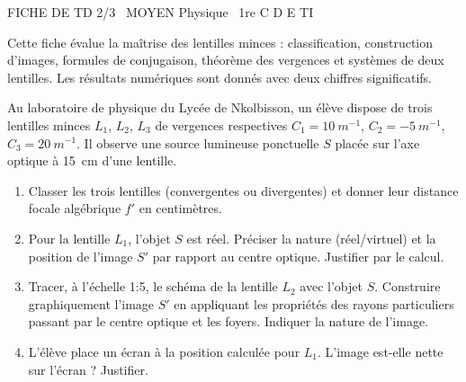 \documentclass[11pt]{article}
\begin{document}
\begin{tcolorbox}[enhanced,colback=popink,colframe=popink,arc=10pt,boxrule=0pt,left=12pt,right=12pt,top=9pt,bottom=9pt]
{\color{white}\popxbold\small FICHE DE TD 2/3 \textbullet\ MOYEN \hfill Physique \textbullet\ 1re C D E TI\par}
\end{tcolorbox}
\vspace{4pt}
\noindent Cette fiche évalue la maîtrise des lentilles minces : classification, construction d'images, formules de conjugaison, théorème des vergences et systèmes de deux lentilles. Les résultats numériques sont donnés avec deux chiffres significatifs.

\begin{exercice}
Au laboratoire de physique du Lycée de Nkolbisson, un élève dispose de trois lentilles minces $L_1$, $L_2$, $L_3$ de vergences respectives $C_1 = \SI{+10}{m^{-1}}$, $C_2 = \SI{-5}{m^{-1}}$, $C_3 = \SI{+20}{m^{-1}}$. Il observe une source lumineuse ponctuelle $S$ placée sur l'axe optique à \SI{15}{cm} d'une lentille.
\begin{enumerate}
    \item Classer les trois lentilles (convergentes ou divergentes) et donner leur distance focale algébrique $f'$ en centimètres.
    \item Pour la lentille $L_1$, l'objet $S$ est réel. Préciser la nature (réel/virtuel) et la position de l'image $S'$ par rapport au centre optique. Justifier par le calcul.
    \item Tracer, à l'échelle 1:5, le schéma de la lentille $L_2$ avec l'objet $S$. Construire graphiquement l'image $S'$ en appliquant les propriétés des rayons particuliers passant par le centre optique et les foyers. Indiquer la nature de l'image.
    \item L'élève place un écran à la position calculée pour $L_1$. L'image est-elle nette sur l'écran ? Justifier.
\end{enumerate}
\end{exercice}
\end{document}
